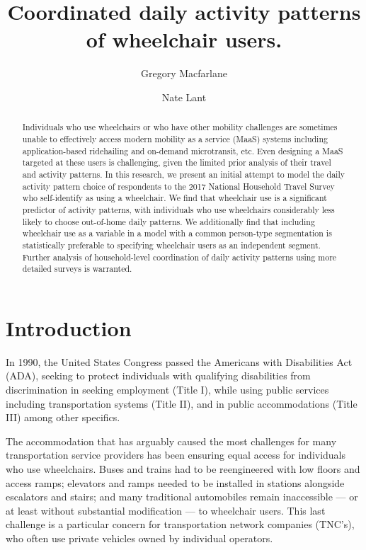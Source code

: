 \documentclass[3p, authoryear, review]{elsarticle} %
\begin{document}
\begin{frontmatter}

  \title{Coordinated daily activity patterns of wheelchair users.}
    \author[Brigham Young University]{Gregory Macfarlane}
    \author[Brigham Young University]{Nate Lant}
      \address[Brigham Young University]{Civil and Environmental Engineering Department, 430 Engineering Building, Provo, Utah 84602}
  
  \begin{abstract}
  Individuals who use wheelchairs or who have other mobility challenges are sometimes unable to effectively access modern mobility as a service (MaaS) systems including application-based ridehailing and on-demand microtransit, etc. Even designing a MaaS targeted at these users is challenging, given the limited prior analysis of their travel and activity patterns. In this research, we present an initial attempt to model the daily activity pattern choice of respondents to the 2017 National Household Travel Survey who self-identify as using a wheelchair. We find that wheelchair use is a significant predictor of activity patterns, with individuals who use wheelchairs considerably less likely to choose out-of-home daily patterns. We additionally find that including wheelchair use as a variable in a model with a common person-type segmentation is statistically preferable to specifying wheelchair users as an independent segment. Further analysis of household-level coordination of daily activity patterns using more detailed surveys is warranted.
  \end{abstract}
  
 \end{frontmatter}

\hypertarget{intro}{%
\section{Introduction}\label{intro}}

In 1990, the United States Congress passed the Americans with Disabilities Act (ADA),
seeking to protect individuals with qualifying disabilities from discrimination
in seeking employment (Title I), while using public services including
transportation systems (Title II), and in public accommodations (Title III) among
other specifics.

The accommodation that has arguably caused the most challenges
for many transportation service providers has been ensuring equal
access for individuals who use wheelchairs. Buses and trains had to be reengineered
with low floors and access ramps; elevators and ramps needed to be installed
in stations alongside escalators and stairs; and many traditional automobiles
remain inaccessible --- or at least without substantial modification --- to
wheelchair users. This last challenge is a particular concern for transportation
network companies (TNC's), who often use private vehicles owned by individual
operators.
\end{document}
